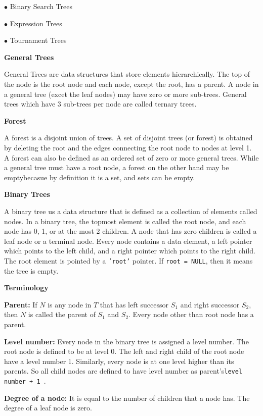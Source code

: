 \vskip 3mm
\qquad$\bullet$ Binary Search Trees

\vskip 3mm
\qquad$\bullet$ Expression Trees

\vskip 3mm
\qquad$\bullet$ Tournament Trees

\vskip 3mm
{\bf General Trees}

\vskip 1mm
General Trees are data structures that store elements hierarchically. The top of the node is the root node and each node, except the root, has a parent. A node in a general tree (excet the leaf nodes) may have zero or more sub-trees. General trees which have 3 sub-trees per node are called ternary trees.

\vskip 3mm
{\bf Forest}

\vskip 1mm
A forest is a disjoint union of trees. A set of disjoint trees (or forest) is obtained by deleting the root and the edges connecting the root node to nodes at level 1. A forest can also be defined as an ordered set of zero or more general trees. While a general tree must have a root node, a forest on the other hand may be emptybecasue by definition it is a set, and sets can be empty.

\vskip 3mm
{\bf Binary Trees}

\vskip 1mm
A binary tree us a data structure that is defined as a collection of elements called nodes. In a binary tree, the topmost element is called the root node, and each node has 0, 1, or at the most 2 children. A node that has zero children is called a leaf node or a terminal node. Every node contains a data element, a left pointer which points to the left child, and a right pointer which points to the right child. The root element is pointed by a {\tt 'root'} pointer. If {\tt root = NULL}, then it means the tree is empty.

\vskip 3mm
{\bf Terminology}

\vskip 1mm
{\bf Parent:} If $N$ is any node in $T$ that has left successor $S_1$ and right successor $S_2$, then $N$ is called the parent of $S_1$ and $S_2$. Every node other than root node has a parent.

\vskip 3mm
{\bf Level number:} Every node in the binary tree is assigned a level number. The root node is defined to be at level 0. The left and right child of the root node have a level number 1. Similarly, every node is at one level higher than its parents. So all child nodes are defined to have level number as parent's{\tt level number + 1 }.

\vskip 3mm
{\bf Degree of a node:} It is equal to the number of children that a node has. The degree of a leaf node is zero.

